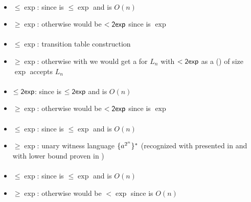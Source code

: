 \paragraph{\OLA{}\tto\TNFA}
\begin{itemize}
	\item $\le\exp$: since \hyperref[cost:1LAto1NFA]{\OLA{}\tto\ONFA} is $\le\exp$ and \ONFA\tto\TNFA is $O(n)$
	\item $\ge\exp$: otherwise \hyperref[cost:1LAto1DFA]{\OLA{}\tto\ODFA} would be $<\mathsf{2exp}$ since \TNFA\tto\ODFA is $\exp$
\end{itemize}
\paragraph{\ODLA{}\tto\ODFA}\label{cost:1DLAto1DFA}
\begin{itemize}
	\item $\le\exp$: transition table construction \cite{PigPis14}
	\item $\ge\exp$: otherwise with \hyperref[cost:1DLAto1DFA]{\ODLA{}\tto\ODFA} we would get a \ODFA for $L_n$ with $<\mathsf{2exp}$ as a \ODLA (\TDFA) of size $\exp$ accepts $L_n$ \cite{PigPis14}
\end{itemize}
\paragraph{\OLA{}\tto\ODLA}
\begin{itemize}
	\item $\le\mathsf{2exp}$: since \hyperref[cost:1LAto1DFA]{\OLA{}\tto\ODFA} is $\le\mathsf{2exp}$ and \ODFA\tto\ODLA is $O(n)$
	\item $\ge\exp$: otherwise \hyperref[cost:1LAto1DFA]{\OLA{}\tto\ODFA} would be $<\mathsf{2exp}$ since \ODLA\tto\ODFA is $\exp$
\end{itemize}
\paragraph{\ODLA{}\tto\TNFA}\label{cost:1DLAto2NFA}
\begin{itemize}
	\item $\le\exp$: since \hyperref[cost:1DLAto1DFA]{\ODLA{}\tto\ODFA} is $\le\exp$ and \ODFA\tto\TNFA is $O(n)$
	\item $\ge\exp$: unary witness language $\{a^{2^n}\}^*$ (recognized with \ODLA presented in \cite{PigPri19} and with \TNFA lower bound proven in \cite{MerPig00})
\end{itemize}
\paragraph{\ODLA{}\tto\ONFA}
\begin{itemize}
	\item $\le\exp$: since \hyperref[cost:1DLAto1DFA]{\ODLA{}\tto\ODFA} is $\le\exp$ and \ODFA\tto\ONFA is $O(n)$
	\item $\ge\exp$: otherwise \hyperref[cost:1DLAto2NFA]{\ODLA{}\tto\TNFA} would be $<\exp$ since \ONFA\tto\TNFA is $O(n)$
\end{itemize}
